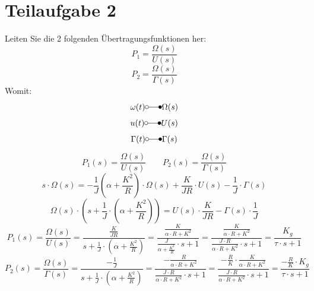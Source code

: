 \section{Teilaufgabe 2}
\begin{aufgabe}
    Leiten Sie die 2 folgenden Übertragungsfunktionen her:
    \[ P_1 = \frac{\Omega(s)}{U(s)} \]
    \[ P_2 = \frac{\Omega(s)}{\Gamma(s)} \]
    Womit: 
    \[ \omega(t) \laplace \Omega(s) \]
    \[ u(t) \laplace U(s) \]
    \[ \Gamma(t) \laplace \Gamma(s) \]
\end{aufgabe}
\[ P_1(s) = \frac{\Omega(s)}{U(s)} \qquad P_2(s) = \frac{\Omega(s)}{\Gamma(s)} \]
\[ s \cdot \Omega(s) 
    = -\frac{1}{J} \left(\alpha + \frac{K^2}{R}\right) \cdot \Omega(s)
    + \frac{K}{JR} \cdot U(s) 
    - \frac{1}{J} \cdot \Gamma(s)
\]
\[ \Omega(s) \cdot \left(s + \frac{1}{J} \cdot \left(\alpha + \frac{K^2}{R}\right)\right) 
    = U(s) \cdot \frac{K}{JR} 
    - \Gamma(s) \cdot \frac{1}{J}
\]
\[ P_1(s) = \frac{\Omega(s)}{U(s)} 
    = \frac{\frac{K}{JR}}{s + \frac{1}{J} \cdot \left(\alpha + \frac{K^2}{R}\right)}
    = \frac{\frac{K}{\alpha \cdot R + K^2}}{\frac{J}{\alpha + \frac{K^2}{R}} \cdot s + 1}
    = \frac{\frac{K}{\alpha \cdot R + K^2}}{\frac{J \cdot R}{\alpha \cdot R + K^2} \cdot s + 1}
    = \frac{K_g}{\tau \cdot s + 1}
\]
\[ P_2(s) = \frac{\Omega(s)}{\Gamma(s)}
    = \frac{-\frac{1}{J}}{s + \frac{1}{J} \cdot \left(\alpha + \frac{K^2}{R}\right)}
    = \frac{-\frac{R}{\alpha \cdot R + K^2}}{\frac{J \cdot R}{\alpha \cdot R + K^2} \cdot s + 1}
    = \frac{-\frac{R}{K} \cdot \frac{K}{\alpha \cdot R + K^2}}{\frac{J \cdot R}{\alpha \cdot R + K^2} \cdot s + 1}
    = \frac{-\frac{R}{K} \cdot K_g}{\tau \cdot s + 1}
\]

